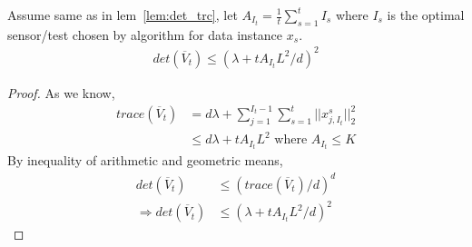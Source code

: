 \begin{lem}
	\label{lem:tight_det_trc}
	Assume same as in lem~\ref{lem:det_trc},  let $A_{I_t} = \frac{1}{t}\sum_{s=1}^{t}I_s$ where $I_s$ is the optimal sensor/test chosen by algorithm for data instance $x_s$. 
	\begin{align*}
	det(\overline{V}_t) \le (\lambda + tA_{I_t}L^2/d)^2
	\end{align*}
	
	\begin{proof}
		As we know, 
		\begin{align*}
		trace(\overline{V}_t) &= d\lambda +\sum_{j=1}^{I_t-1}\sum_{s=1}^{t}||x_{j, I_t}^s||_2^2  \\
		&\le d\lambda + tA_{I_t}L^2 \text{ where $A_{I_t} \le K$}
		\end{align*}
		By inequality of arithmetic and geometric means,
		\begin{align*}
		det(\overline{V}_t) &\le (trace(\overline{V}_t)/d)^d  \\
		\Rightarrow det(\overline{V}_t) &\le (\lambda + tA_{I_t}L^2/d)^2
		\end{align*}
	\end{proof}
\end{lem}



